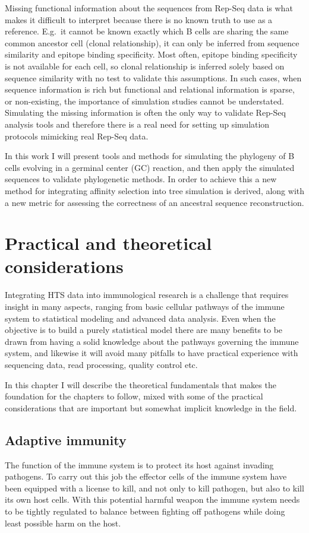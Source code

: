 Missing functional information about the sequences from Rep-Seq data is what makes it difficult to interpret because there is no known truth to use as a reference.
E.g.\ it cannot be known exactly which B cells are sharing the same common ancestor cell (clonal relationship), it can only be inferred from sequence similarity and epitope binding specificity.
Most often, epitope binding specificity is not available for each cell, so clonal relationship is inferred solely based on sequence similarity with no test to validate this assumptions.
In such cases, when sequence information is rich but functional and relational information is sparse, or non-existing, the importance of simulation studies cannot be understated.
Simulating the missing information is often the only way to validate Rep-Seq analysis tools and therefore there is a real need for setting up simulation protocols mimicking real Rep-Seq data.

In this work I will present tools and methods for simulating the phylogeny of B cells evolving in a germinal center (GC) reaction, and then apply the simulated sequences to validate phylogenetic methods.
In order to achieve this a new method for integrating affinity selection into tree simulation is derived, along with a new metric for assessing the correctness of an ancestral sequence reconstruction.




\chapter{Practical and theoretical considerations}
Integrating HTS data into immunological research is a challenge that requires insight in many aspects, ranging from basic cellular pathways of the immune system to statistical modeling and advanced data analysis.
Even when the objective is to build a purely statistical model there are many benefits to be drawn from having a solid knowledge about the pathways governing the immune system, and likewise it will avoid many pitfalls to have practical experience with sequencing data, read processing, quality control etc.

In this chapter I will describe the theoretical fundamentals that makes the foundation for the chapters to follow, mixed with some of the practical considerations that are important but somewhat implicit knowledge in the field.



\section{Adaptive immunity}
The function of the immune system is to protect its host against invading pathogens.
To carry out this job the effector cells of the immune system have been equipped with a license to kill, and not only to kill pathogen, but also to kill its own host cells.
With this potential harmful weapon the immune system needs to be tightly regulated to balance between fighting off pathogens while doing least possible harm on the host.

